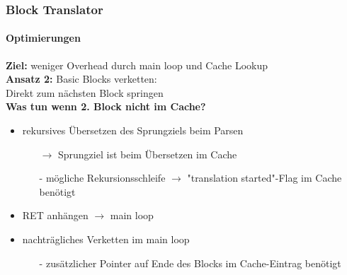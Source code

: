 \documentclass[german]{tum-presentation}
\begin{document}
\begin{frame}[fragile]
	\frametitle{Block Translator}
	\framesubtitle{Optimierungen}
	\textbf{Ziel:} weniger Overhead durch main loop und Cache Lookup \\
	\vspace{0.5cm}
	\textbf{Ansatz 2:} Basic Blocks verketten: \\ Direkt zum nächsten Block springen \\
	\vspace{0.5cm}
	\textbf{Was tun wenn 2. Block nicht im Cache?}\\
	\begin{itemize}
		\item rekursives Übersetzen des Sprungziels beim Parsen
		\begin{itemize}
			\item[$\rightarrow$] Sprungziel ist beim Übersetzen im Cache
			\item[-] mögliche Rekursionsschleife $\rightarrow$ "translation started"-Flag im Cache benötigt
		\end{itemize}
		\item RET anhängen $\rightarrow$ main loop
		\onslide<4->
		\item nachträgliches Verketten im main loop
		\begin{itemize}
			\item[-] zusätzlicher Pointer auf Ende des Blocks im Cache-Eintrag benötigt
		\end{itemize}
	\end{itemize}
\end{frame}
\end{document}
